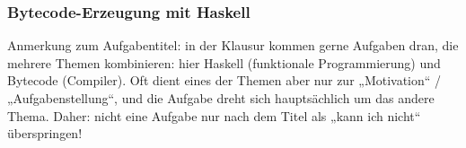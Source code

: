 \documentclass{beamer}
\begin{document}
\begin{frame}
  \frametitle{Bytecode-Erzeugung mit Haskell}
  Anmerkung zum Aufgabentitel:
  in der Klausur kommen gerne Aufgaben dran, die mehrere Themen kombinieren:
  hier Haskell (funktionale Programmierung) und Bytecode (Compiler).
  Oft dient eines der Themen aber nur zur „Motivation“ / „Aufgabenstellung“,
  und die Aufgabe dreht sich hauptsächlich um das andere Thema.
  Daher: nicht eine Aufgabe nur nach dem Titel als „kann ich nicht“ überspringen!
\end{frame}
\end{document}
